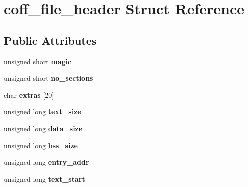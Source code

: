 \hypertarget{structcoff__file__header}{
\section{coff\_\-file\_\-header Struct Reference}
\label{structcoff__file__header}
}
\subsection*{Public Attributes}
\begin{DoxyCompactItemize}
\item 
\hypertarget{structcoff__file__header_af0ede941444cca81ca1015ebcfb3a63a}{
unsigned short {\bfseries magic}}
\label{structcoff__file__header_af0ede941444cca81ca1015ebcfb3a63a}

\item 
\hypertarget{structcoff__file__header_a9e71a1fee93bf716b0b87e14fe34f2d5}{
unsigned short {\bfseries no\_\-sections}}
\label{structcoff__file__header_a9e71a1fee93bf716b0b87e14fe34f2d5}

\item 
\hypertarget{structcoff__file__header_a693a1fd453de824f5327a0e29464867b}{
char {\bfseries extras} \mbox{[}20\mbox{]}}
\label{structcoff__file__header_a693a1fd453de824f5327a0e29464867b}

\item 
\hypertarget{structcoff__file__header_a4698d9c30e72e0943eb18b68c21a067c}{
unsigned long {\bfseries text\_\-size}}
\label{structcoff__file__header_a4698d9c30e72e0943eb18b68c21a067c}

\item 
\hypertarget{structcoff__file__header_a721f91dfdbd330fa01a181fe09657576}{
unsigned long {\bfseries data\_\-size}}
\label{structcoff__file__header_a721f91dfdbd330fa01a181fe09657576}

\item 
\hypertarget{structcoff__file__header_aa25757530dc4349808158515fe01ea0a}{
unsigned long {\bfseries bss\_\-size}}
\label{structcoff__file__header_aa25757530dc4349808158515fe01ea0a}

\item 
\hypertarget{structcoff__file__header_a824eee83be2037d48f8bc13362cf8b94}{
unsigned long {\bfseries entry\_\-addr}}
\label{structcoff__file__header_a824eee83be2037d48f8bc13362cf8b94}

\item 
\hypertarget{structcoff__file__header_a89e2d93abfe39040744e4cecee38b1db}{
unsigned long {\bfseries text\_\-start}}
\label{structcoff__file__header_a89e2d93abfe39040744e4cecee38b1db}


\end{DoxyCompactItemize}
